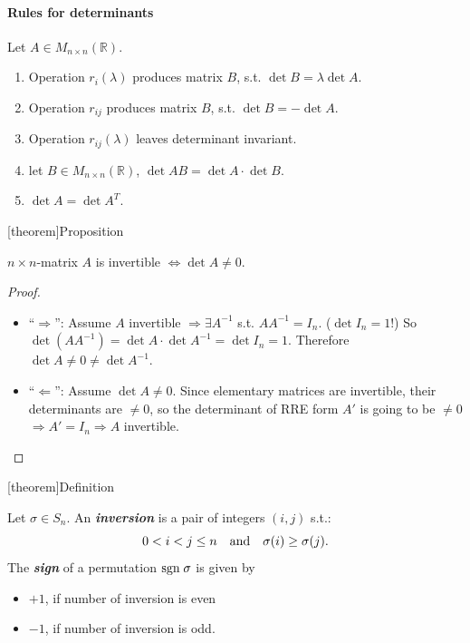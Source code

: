 \documentclass[12pt]{report}
\theoremstyle{definition}
\begin{document}
\paragraph{Rules for determinants}
Let $A \in M_{n\times n}(\mathbb{R})$.
\begin{enumerate}[label = (\arabic*)]
    \item Operation $r_i(\lambda)$ produces matrix $B$, s.t. $\det{B} = \lambda \det{A}$.
    \item Operation $r_{ij}$ produces matrix $B$, s.t. $\det{B} = - \det{A}$.
    \item Operation $r_{ij}(\lambda)$ leaves determinant invariant.
    \item let $B \in M_{n\times n}(\mathbb{R})$, $\det{AB} = \det{A} \cdot \det{B}$.
    \item $\det{A} = \det{A^{T}}$.
\end{enumerate}

[theorem]{Proposition}
\begin{invertible matrix is not 0}
    $n\times n$-matrix $A$ is invertible $\iff \det{A} \neq 0$.
\end{invertible matrix is not 0}

\begin{proof}
    \,

    \begin{itemize}
            \item ``$\Rightarrow{}$'': Assume $A$ invertible
                $\Rightarrow{} \exists A^{-1}$ s.t. $AA^{-1} = I_n$.
                ($\det{I_n} = 1$!) So
                $\det{(AA^{-1})} = \det{A}\cdot\det{A^{-1}} = \det{I_n} = 1$.
                Therefore $\det{A} \neq 0 \neq \det{A^{-1}}$.

            \item ``$\Leftarrow$'': Assume $\det{A} \neq 0$.
                Since elementary matrices are invertible, their determinants are $\neq 0$,
                so the determinant of RRE form $A'$ is going to be $\neq 0$
                $\Rightarrow{}A' = I_n \Rightarrow{}A$ invertible.
    \end{itemize}
\end{proof}

[theorem]{Definition}
\begin{permutation theory}
    Let $\sigma \in S_n$. An \textbf{\emph{inversion}} is a pair of integers $(i,j)$ s.t.:\[
        0 < i < j \le n \quad\textnormal{and}\quad \sigma(i)\ge\sigma(j).
    \]
    The \textbf{\emph{sign}} of a permutation $\textnormal{sgn}\;\sigma$ is given by
    \begin{itemize}
            \item $+1$, if number of inversion is even
            \item $-1$, if number of inversion is odd.
    \end{itemize}
\end{permutation theory}
\end{document}
